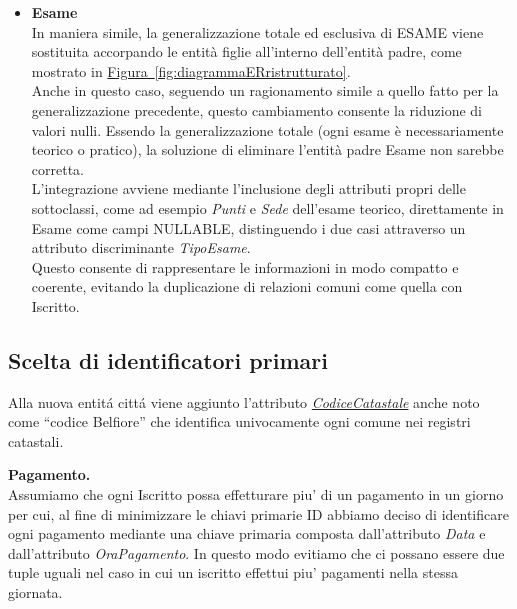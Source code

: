 \documentclass[10pt,twoside]{article}
\begin{document}
{{\begin{itemize}
            spostando in esse gli attributi specifici, ma ciò avrebbe comportato la duplicazione 
            delle relazioni comuni come Prenotazione e Recensione verso entrambe
            le sottoclassi.
            \item \textbf{Esame} \\In maniera simile, la generalizzazione totale ed esclusiva di ESAME viene sostituita 
            accorpando le entità figlie all’interno dell'entità padre, come mostrato in \hyperref[fig:diagrammaERristrutturato]{Figura~\ref*{fig:diagrammaERristrutturato}}. \\ 
            Anche in questo caso, seguendo un ragionamento simile a quello fatto per la 
            generalizzazione precedente, questo cambiamento consente la riduzione di valori nulli.
            Essendo la generalizzazione totale (ogni esame è necessariamente teorico o pratico), 
            la soluzione di eliminare l’entità padre Esame non sarebbe corretta. \\
            L'integrazione avviene mediante l'inclusione degli attributi propri delle sottoclassi,
            come ad esempio \textit{Punti} e \textit{Sede} dell'esame teorico, direttamente in Esame come campi 
            NULLABLE, distinguendo i due casi attraverso un attributo discriminante \textit{TipoEsame}. \\
            Questo consente di rappresentare le informazioni in modo compatto e coerente, 
            evitando la duplicazione di relazioni comuni come quella con Iscritto.
        \end{itemize}
    }

    \subsection{Scelta di identificatori primari}{
        Alla nuova entitá cittá viene aggiunto l’attributo \href{https://www.agenziaentrate.gov.it/portale/documents/20143/448384/Tabella+codici+catastali+comuni_T4_codicicatastali_comuni_24_05_2019.pdf/d4fa70bd-f4bd-caba-24cb-5cc3611237c0}{\textit{CodiceCatastale}} anche noto come “codice
        Belfiore” che identifica univocamente ogni comune nei registri catastali.
        
        \textbf{Pagamento.} \\ 
        Assumiamo che ogni Iscritto possa effetturare piu' di un pagamento in un giorno per cui, al fine di minimizzare le chiavi primarie ID abbiamo deciso di identificare ogni pagamento mediante una chiave primaria composta dall'attributo \textit{Data} e dall'attributo \textit{OraPagamento}. In questo modo evitiamo che ci possano essere due tuple uguali nel caso in cui un iscritto effettui piu' pagamenti nella stessa giornata.\\
    }

}
\end{document}
